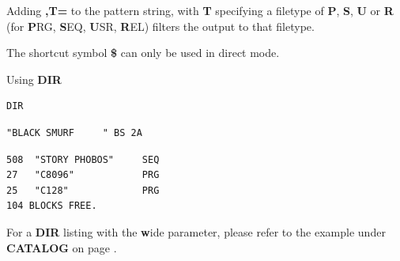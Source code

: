 \begin{description}[leftmargin=2cm,style=nextline]
   Adding {\bf ,T=} to the pattern string, with {\bf T} specifying
   a filetype of {\bf P}, {\bf S}, {\bf U} or {\bf R}
   (for {\bf P}RG, {\bf S}EQ, {\bf U}SR, {\bf R}EL) filters the
   output to that filetype.

   The shortcut symbol {\bf \$} can only be used in direct mode.

\item [Examples:] Using {\bf DIR}

\begin{tcolorbox}[colback=black,coltext=white]
\verbatimfont{\codefont}
\begin{verbatim}
DIR
\end{verbatim}
\selectfont{\codefont 0}
\begin{tcolorbox}[colback=white,coltext=black,arc=0mm,boxrule=0mm,
       left*=0.5mm,right*=0mm,top=0mm,bottom=0mm,nobeforeafter,
       left skip=0.5mm,
       width=28mm,height=3mm,valign=center]
\begin{verbatim}
"BLACK SMURF     " BS 2A
\end{verbatim}
\end{tcolorbox}
\begin{verbatim}
508  "STORY PHOBOS"     SEQ
27   "C8096"            PRG
25   "C128"             PRG
104 BLOCKS FREE.
\end{verbatim}
\end{tcolorbox}

For a {\bf DIR} listing with the {\bf w}ide parameter, please refer to the example under {\bf CATALOG}
on page \pageref{3columndirlisting}.

\end{description}


\newpage
